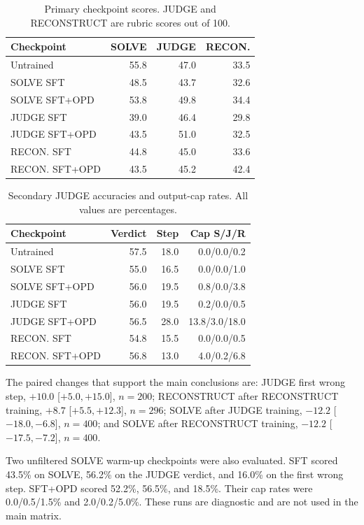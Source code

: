 \documentclass[11pt]{article}
\begin{document}
\begin{table}[h]
\centering
\footnotesize
\setlength{\tabcolsep}{3pt}
\begin{tabular}{lrrr}
\toprule
Checkpoint & SOLVE & JUDGE & RECON. \\
\midrule
Untrained & 55.8 & 47.0 & 33.5 \\
SOLVE SFT & 48.5 & 43.7 & 32.6 \\
SOLVE SFT+OPD & 53.8 & 49.8 & 34.4 \\
JUDGE SFT & 39.0 & 46.4 & 29.8 \\
JUDGE SFT+OPD & 43.5 & 51.0 & 32.5 \\
RECON. SFT & 44.8 & 45.0 & 33.6 \\
RECON. SFT+OPD & 43.5 & 45.2 & 42.4 \\
\bottomrule
\end{tabular}
\caption{Primary checkpoint scores. JUDGE and RECONSTRUCT are rubric scores out of 100.}
\label{tab:transfer-full}
\end{table}

\begin{table}[h]
\centering
\footnotesize
\setlength{\tabcolsep}{2.7pt}
\begin{tabular}{lrrr}
\toprule
Checkpoint & Verdict & Step & Cap S/J/R \\
\midrule
Untrained & 57.5 & 18.0 & 0.0/0.0/0.2 \\
SOLVE SFT & 55.0 & 16.5 & 0.0/0.0/1.0 \\
SOLVE SFT+OPD & 56.0 & 19.5 & 0.8/0.0/3.8 \\
JUDGE SFT & 56.0 & 19.5 & 0.2/0.0/0.5 \\
JUDGE SFT+OPD & 56.5 & 28.0 & 13.8/3.0/18.0 \\
RECON. SFT & 54.8 & 15.5 & 0.0/0.0/0.5 \\
RECON. SFT+OPD & 56.8 & 13.0 & 4.0/0.2/6.8 \\
\bottomrule
\end{tabular}
\caption{Secondary JUDGE accuracies and output-cap rates. All values are percentages.}
\label{tab:transfer-secondary}
\end{table}

The paired changes that support the main conclusions are: JUDGE first wrong step, $+10.0$ [$+5.0,+15.0$], $n=200$; RECONSTRUCT after RECONSTRUCT training, $+8.7$ [$+5.5,+12.3$], $n=296$; SOLVE after JUDGE training, $-12.2$ [$-18.0,-6.8$], $n=400$; and SOLVE after RECONSTRUCT training, $-12.2$ [$-17.5,-7.2$], $n=400$.

Two unfiltered SOLVE warm-up checkpoints were also evaluated. SFT scored 43.5\% on SOLVE, 56.2\% on the JUDGE verdict, and 16.0\% on the first wrong step. SFT+OPD scored 52.2\%, 56.5\%, and 18.5\%. Their cap rates were 0.0/0.5/1.5\% and 2.0/0.2/5.0\%. These runs are diagnostic and are not used in the main matrix.
\end{document}
